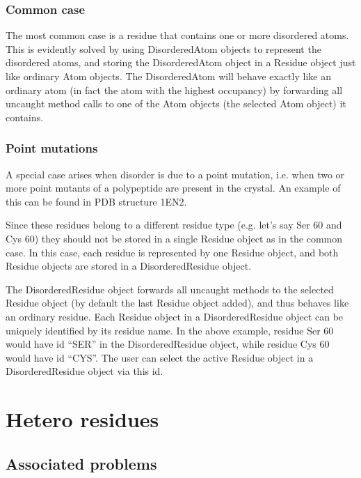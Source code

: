 \documentclass{report}
\begin{document}
\subsubsection{Common case}

The most common case is a residue that contains one or more disordered atoms.
This is evidently solved by using DisorderedAtom objects to represent the disordered
atoms, and storing the DisorderedAtom object in a Residue object just like ordinary
Atom objects. The DisorderedAtom will behave exactly like an ordinary atom (in
fact the atom with the highest occupancy) by forwarding all uncaught method
calls to one of the Atom objects (the selected Atom object) it contains.

\subsubsection{Point mutations\label{point mutations}}

A special case arises when disorder is due to a point mutation, i.e. when two
or more point mutants of a polypeptide are present in the crystal. An example
of this can be found in PDB structure 1EN2.

Since these residues belong to a different residue type (e.g. let's say Ser
60 and Cys 60) they should not be stored in a single Residue object as in the
common case. In this case, each residue is represented by one Residue object,
and both Residue objects are stored in a DisorderedResidue object.

The DisorderedResidue object forwards all uncaught methods to the selected Residue
object (by default the last Residue object added), and thus behaves like an
ordinary residue. Each Residue object in a DisorderedResidue object can be uniquely
identified by its residue name. In the above example, residue Ser 60 would have
id {}``SER{}'' in the DisorderedResidue object, while residue Cys 60 would
have id {}``CYS{}''. The user can select the active Residue object in a DisorderedResidue
object via this id.

\section{Hetero residues}

\subsection{Associated problems\label{hetero probems}}
\end{document}
